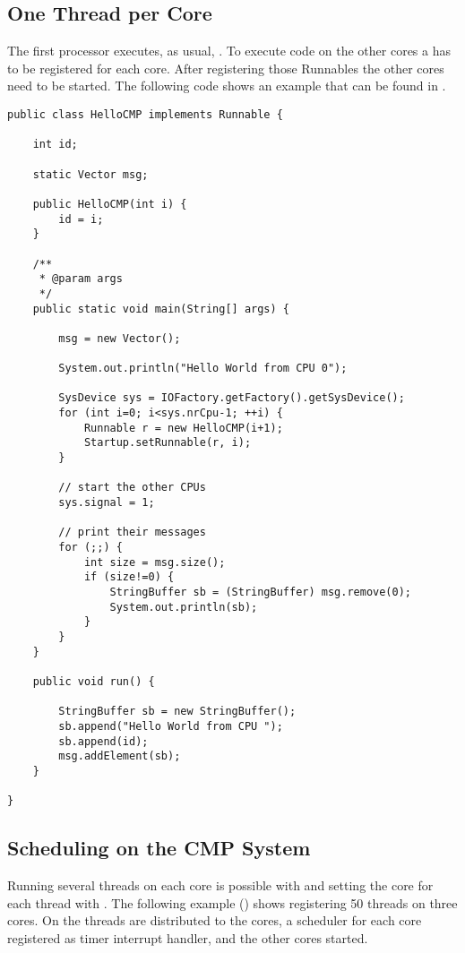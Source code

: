 \subsection{One Thread per Core}


The first processor executes, as usual, . To execute
code on the other cores a  has to be registered for
each core. After registering those Runnables the other cores need to
be started. The following code shows an example that can be found in
.

\begin{verbatim}
public class HelloCMP implements Runnable {

    int id;

    static Vector msg;

    public HelloCMP(int i) {
        id = i;
    }

    /**
     * @param args
     */
    public static void main(String[] args) {

        msg = new Vector();

        System.out.println("Hello World from CPU 0");

        SysDevice sys = IOFactory.getFactory().getSysDevice();
        for (int i=0; i<sys.nrCpu-1; ++i) {
            Runnable r = new HelloCMP(i+1);
            Startup.setRunnable(r, i);
        }

        // start the other CPUs
        sys.signal = 1;

        // print their messages
        for (;;) {
            int size = msg.size();
            if (size!=0) {
                StringBuffer sb = (StringBuffer) msg.remove(0);
                System.out.println(sb);
            }
        }
    }

    public void run() {

        StringBuffer sb = new StringBuffer();
        sb.append("Hello World from CPU ");
        sb.append(id);
        msg.addElement(sb);
    }

}
\end{verbatim}

\subsection{Scheduling on the CMP System}

Running several threads on each core is possible with 
and setting the core for each thread with
. The following example
() shows registering 50 threads on
three cores. On  the threads are distributed to
the cores, a scheduler for each core registered as timer interrupt
handler, and the other cores started.

